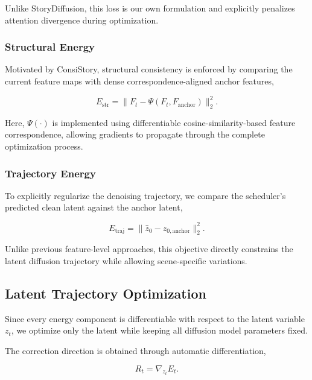 \documentclass[12pt]{article}
\begin{document}
Unlike StoryDiffusion, this loss is our own formulation and explicitly penalizes attention divergence during optimization.

\subsubsection{Structural Energy}

Motivated by ConsiStory, structural consistency is enforced by comparing the current feature maps with dense correspondence-aligned anchor features,

\begin{equation}
E_{\mathrm{str}} = \|F_t - \Psi(F_t, F_{\mathrm{anchor}})\|_2^2.
\tag{8}
\end{equation}

Here, $\Psi(\cdot)$ is implemented using differentiable cosine-similarity-based feature correspondence, allowing gradients to propagate through the complete optimization process.

\subsubsection{Trajectory Energy}

To explicitly regularize the denoising trajectory, we compare the scheduler's predicted clean latent against the anchor latent,

\begin{equation}
E_{\mathrm{traj}} = \|\hat{z}_0 - z_{0,\mathrm{anchor}}\|_2^2.
\tag{9}
\end{equation}

Unlike previous feature-level approaches, this objective directly constrains the latent diffusion trajectory while allowing scene-specific variations.

\subsection{Latent Trajectory Optimization}

Since every energy component is differentiable with respect to the latent variable $z_t$, we optimize only the latent while keeping all diffusion model parameters fixed.

The correction direction is obtained through automatic differentiation,

\begin{equation}
R_t = \nabla_{z_t} E_t.
\tag{10}
\end{equation}
\end{document}
